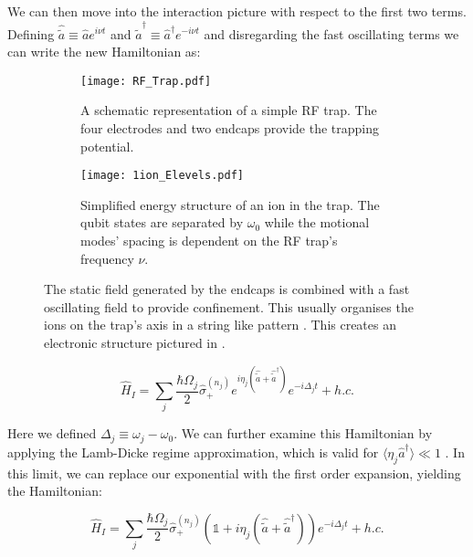 \documentclass[12pt,twoside]{report}
\begin{document}
We can then move into the interaction picture with respect to the first two terms. Defining $\hat{\tilde{a}}\equiv\hat{a}e^{i\nu t}$ and $\hat{\tilde{a}}^\dagger\equiv\hat{a}^\dagger e^{-i\nu t}$ and disregarding the fast oscillating terms we can write the new Hamiltonian as:

\begin{figure}[t!]
	\centering
	\begin{subfigure}[t]{0.4\textwidth}
		\centering
		\texttt{[image: RF\_Trap.pdf]}
		\caption{A schematic representation of a simple RF trap. The four electrodes and two endcaps provide the trapping potential.}
		\label{fig:rftrap:schematic}
	\end{subfigure}
	\hfill
	\begin{subfigure}[t]{0.55\textwidth}
		\centering
		\texttt{[image: 1ion\_Elevels.pdf]}
		\caption{Simplified energy structure of an ion in the trap. The qubit states are separated by $\omega_0$ while the motional modes' spacing is dependent on the RF trap's frequency $\nu$.}
		\label{fig:rftrap:estructure}
	\end{subfigure}
	\caption[RF Trap schematic and energy]{The static field generated by the endcaps is combined with a fast oscillating field to provide confinement. This usually organises the ions on the trap's axis in a string like pattern \cite{RF_Traps,Charged_Particle_traps_Paul}. This creates an electronic structure pictured in .}
	\label{fig:rftrap}
\end{figure}

\begin{equation}
	\hat{H}_I = \sum_{j}\frac{\hbar\Omega_j}{2}\hat{\sigma}^{\left(n_j\right)}_+e^{i\eta_j\left(\hat{\tilde{a}} + \hat{\tilde{a}}^\dagger\right)} e^{-i\Delta_jt} + h.c.
	\label{eq:Interaction_H}
\end{equation}

Here we defined $\Delta_j\equiv\omega_j-\omega_0$. We can further examine this Hamiltonian by applying the Lamb-Dicke regime approximation, which is valid for $\langle\eta_j\hat{a}^\dagger\rangle \ll 1$ \cite{MS_gate}. In this limit, we can replace our exponential with the first order expansion, yielding the Hamiltonian:

\begin{equation}
	\hat{H}_I = \sum_{j}\frac{\hbar\Omega_j}{2}\hat{\sigma}^{\left(n_j\right)}_+\left(\mathds{1} + i\eta_j\left(\hat{\tilde{a}} + \hat{\tilde{a}}^\dagger\right)\right)e^{-i\Delta_jt} + h.c.
	\label{eq:Interaction_H_LD}
\end{equation}
\end{document}
